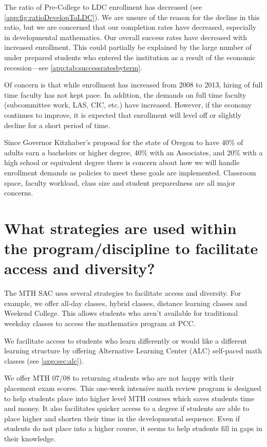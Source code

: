 The ratio of Pre-College to LDC enrollment has decreased (see
\vref{app:fig:ratioDevelopToLDC}). We are unsure of the reason for the decline
in this ratio, but we are concerned that our completion rates have decreased,
especially in developmental mathematics. Our overall success rates have
decreased with increased enrollment.  This could partially be explained by the
large number of under prepared students who entered the institution as a result
of the economic recession---see \vref{app:tab:successratesbyterm}.

Of concern is that while enrollment has increased from 2008 to 2013, hiring of
full time faculty has not kept pace. In addition, the demands on full time
faculty (subcommittee work, LAS, CIC,  etc.) have increased.   However,
if the economy continues to improve, it is expected that enrollment will level
off or slightly decline for a short period of time.

Since Governor Kitzhaber's proposal for the state of Oregon to have 40\% of
adults earn a bachelors or higher degree, 40\% with an Associates, and 20\%
with a high school or equivalent degree there is concern about how we will handle
enrollment demands as policies to meet these goals are implemented.
Classroom space, faculty workload, class size and student preparedness are all
major concerns.

\section{What strategies are used within the program/discipline to facilitate access and diversity?}
The MTH SAC uses several strategies to facilitate access and diversity. For
example, we offer all-day classes, hybrid classes, distance learning classes
and Weekend College. This allows students who aren't available for traditional
weekday classes to access the mathematics program at PCC. 

We facilitate access to students who learn differently or would like a
different learning structure by offering  Alternative Learning Center (ALC)
self-paced math classes (see \vref{app:sec:alc}).

We offer MTH 07/08  to returning students who are not happy with their
placement exam scores. This one-week intensive math review program is designed
to help students place into higher level MTH courses which saves students time
and money. It also facilitates quicker access to a degree if students are able
to place higher and shorten their time in the developmental sequence.  Even if
students do not place into a higher course, it seems to help students fill in
gaps in their knowledge.

